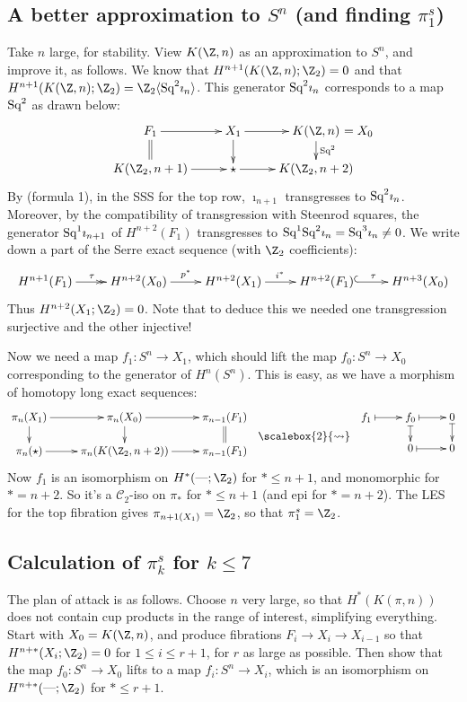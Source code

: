 \documentclass[11pt]{article}
\newcommand{\Squ}{\textup{Sq}}
\newcommand{\DASH}{\textup{---}}
\theoremstyle{plain}
\theoremstyle{definition}
\renewcommand{\to}{\longrightarrow}
\newcommand{\bigrightsquig}{\scalebox{2}{\ensuremath{\rightsquigarrow}}}
\newcommand{\SerreClass}{\mathscr{C}}
\begin{document}
\subsection{A better approximation to \texorpdfstring{$S^n$}{Sn}
 (and finding \texorpdfstring{$\pi_1^s$}{the stable 1-stem})}
Take $n$ large, for stability. View $K(\Z,n)$ as an approximation to $S^n$, and improve it, as follows. We know that $H^{n+1}(K(\Z,n);\Z_2)=0$ and that $H^{n+1}(K(\Z,n);\Z_2)=\Z_2\langle\Squ^2\imath_n\rangle$. This generator $\Squ^2\imath_n$ corresponds to a map $\Squ^2$ as drawn below:
\[\xymatrix@R=5mm{
F_1\ar[r]\ar@{=}[d]&X_1\ar[d]\ar[r]&K(\Z,n)\makebox[0cm][l]{\,\,$=X_0$}\ar[d]^{\Squ^2}\\
K(\Z_2,n+1)\ar[r]&\star\ar[r]&K(\Z_2,n+2)
}\]
By (formula 1), in the SSS for the top row, $\imath_{n+1}$ transgresses to $\Squ^2\imath_n$. Moreover, by the compatibility of transgression with Steenrod squares, the generator $\Squ^1\imath_{n+1}$ of $H^{n+2}(F_1)$ transgresses to $\Squ^1\Squ^2\imath_{n}=\Squ^3\imath_{n}\neq0$.
We write down a part of the Serre exact sequence (with $\Z_2$ coefficients):
\[\xymatrix{
H^{n+1}(F_1)\ar@{->>}[r]^{\tau}&H^{n+2}(X_0)\ar[r]^{p^*}&H^{n+2}(X_1)\ar[r]^{i^*}&H^{n+2}(F_1)\ar@{^{(}->}[r]^{\tau}&H^{n+3}(X_0)
}\]
Thus $H^{n+2}(X_1;\Z_2)=0$. Note that to deduce this we needed one transgression surjective and the other injective!

Now we need a map $f_1:S^n\to X_1$, which should lift the map $f_0:S^n\to X_0$ corresponding to the generator of $H^n(S^n)$. This is easy, as we have a morphism of homotopy long exact sequences:
\[\xymatrix@R=5mm{
\pi_n(X_1)\ar[r]\ar[d]&\pi_n(X_0)\ar[r]\ar[d]&\pi_{n-1}(F_1)\ar@{=}[d]\\
\pi_n(\star)\ar[r]&\pi_n(K(\Z_2,n+2))\ar[r]&\pi_{n-1}(F_1)\\
}\raisebox{-.6cm}{\ \ $\bigrightsquig$\ \ }
\xymatrix@R=5mm{
f_1\ar@{|->}[r]&f_0\ar@{|->}[r]\ar@{|->}[d]&0\ar@{|->}[d]\\
&0\ar@{|->}[r]&0
}\]
Now $f_1$ is an isomorphism on $H^*(\DASH;\Z_2)$ for $*\leq n+1$, and 
monomorphic for $*=n+2$. So it's a $\SerreClass_2$-iso on $\pi_*$ for 
$*\leq n+1$ (and epi for $*=n+2$). The LES for the top fibration gives 
$\pi_{n+1(X_1)}=\Z_2$, so that $\pi_1^s=\Z_2$.

\subsection{Calculation of \texorpdfstring{$\pi_k^s$ for $k\leq7$}{stable 
k-stem, k<8}}
The plan of attack is as follows. Choose $n$ very large, so that $H^*(K(\pi,n))$
does not contain cup products in the range of interest, simplifying everything.
Start with $X_0=K(\Z,n)$, and produce fibrations $F_i\to X_i\to X_{i-1}$ so that
$H^{n+*}(X_i;\Z_2)=0$ for $1\leq i\leq r+1$, for $r$ as large as possible. Then 
show that the map $f_0:S^n\to X_0$ lifts to a map $f_i:S^n\to X_i$, which is an
isomorphism on $H^{n+*}(\DASH;\Z_2)$ for $*\leq r+1$.
\end{document}
